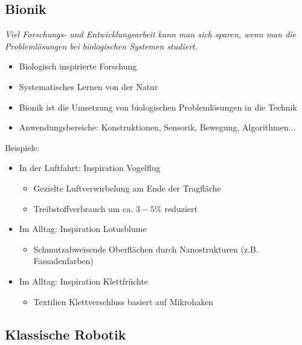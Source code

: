 \subsection{Bionik}
\emph{Viel Forschungs- und Entwicklungsarbeit kann man sich sparen,
wenn man die Problemlösungen bei biologischen Systemen studiert.}
\begin{itemize}
	\item Biologisch inspirierte Forschung
	\item Systematisches Lernen von der Natur
	\item Bionik ist die Umsetzung von biologischen Problemlösungen in die Technik
	\item Anwendungsbereiche: Konstruktionen, Sensorik, Bewegung, Algorithmen...
\end{itemize}

Beispiele:
\begin{itemize}
	\item In der Luftfahrt: Inspiration Vogelflug
	\begin{itemize}
		\item Gezielte Luftverwirbelung am Ende der Tragfläche
		\item Treibstoffverbrauch um ca. $3-5\%$ reduziert
	\end{itemize}
	\item Im Alltag: Inspiration Lotusblume
	\begin{itemize}
		\item Schmutzabweisende Oberflächen durch Nanostrukturen (z.B. Fassadenfarben)
	\end{itemize}
	\item Im Alltag: Inspiration Klettfrüchte
	\begin{itemize}
		\item Textilien Klettverschluss basiert auf Mikrohaken
	\end{itemize}	
\end{itemize}

\subsection{Klassische Robotik}


